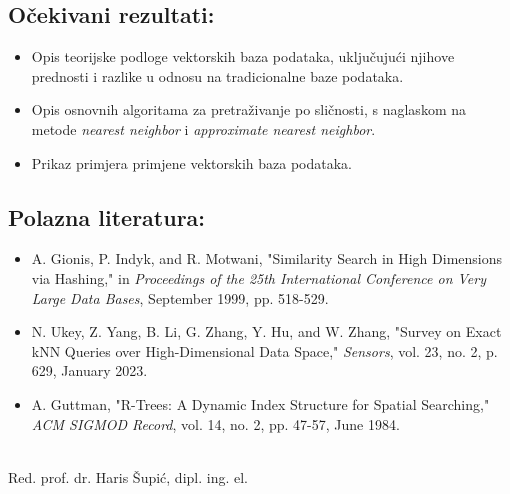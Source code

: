 \subsection*{Očekivani rezultati:}

\begin{itemize}
    \item Opis teorijske podloge vektorskih baza podataka, uključujući njihove prednosti i razlike u odnosu na tradicionalne baze podataka.
    \item Opis osnovnih algoritama za pretraživanje po sličnosti, s naglaskom na metode \textit{nearest neighbor} i \textit{approximate nearest neighbor}.
    \item Prikaz primjera primjene vektorskih baza podataka.
\end{itemize}

\newpage

\subsection*{Polazna literatura:}

\begin{itemize}
    \item[] [1] A. Gionis, P. Indyk, and R. Motwani, "Similarity Search in High Dimensions via Hashing," in \textit{Proceedings of the 25th International Conference on Very Large Data Bases}, September 1999, pp. 518-529.
    \item[] [2] N. Ukey, Z. Yang, B. Li, G. Zhang, Y. Hu, and W. Zhang, "Survey on Exact kNN Queries over High-Dimensional Data Space," \textit{Sensors}, vol. 23, no. 2, p. 629, January 2023.
    \item[] [3] A. Guttman, "R-Trees: A Dynamic Index Structure for Spatial Searching," \textit{ACM SIGMOD Record}, vol. 14, no. 2, pp. 47-57, June 1984.
\end{itemize}

\begin{center}
    \vspace{2cm}
    \makebox[8cm]{\hrulefill}\\
    Red. prof. dr. Haris Šupić, dipl. ing. el.\\
\end{center}

\clearpage